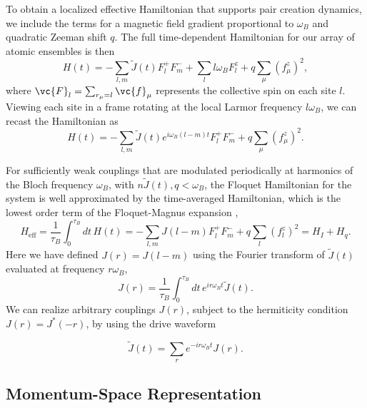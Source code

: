 \begin{bibunit}
To obtain a localized effective Hamiltonian that supports pair creation dynamics, we include the terms for a magnetic field gradient proportional to $\omega_B$ and quadratic Zeeman shift $q$. The full time-dependent Hamiltonian for our array of atomic ensembles is then
\begin{equation}
H(t) = -\sum_{l,m} \tilde{J}(t) F^+_l F^-_m  + \sum_l l \omega_B F^z_l + q\sum_\mu (f^z_\mu)^2,
\label{eq:HtFull}
\end{equation}
where $\vc{F}_l = \sum_{r_{\mu} = l} \vc{f}_\mu$ represents the collective spin on each site $l$. Viewing each site in a frame rotating at the local Larmor frequency $l\omega_B$, we can recast the Hamiltonian as
\begin{equation}
H(t) = -\sum_{l,m}  \tilde{J}(t) e^{i \omega_B (l-m)t}F^+_l F^-_m + q\sum_\mu \left(f^z_\mu\right)^2.
\label{Seq:HtRot}
\end{equation}

For sufficiently weak couplings that are modulated periodically at harmonics of the Bloch frequency $\omega_B$, with $n \tilde{J}(t), q < \omega_B$, the Floquet Hamiltonian for the system is well approximated by the time-averaged Hamiltonian, which is the lowest order term of the Floquet-Magnus expansion \cite{bukov2015universal},
\begin{equation}
H_\text{eff} = \frac{1}{\tau_B} \int_0^{\tau_B} dt\, H(t) = -\sum_{l, m} J(l-m) F^+_l F^-_{m} + q\sum_l (f^z_l)^2 = H_I + H_q.
\label{Seq:H_eff}
\end{equation}
Here we have defined $J(r)= J(l-m)$ using the Fourier transform of $\tilde{J}(t)$ evaluated at frequency $r\omega_B$,
\begin{equation}
J(r) = \frac{1}{\tau_B} \int_0^{\tau_B} dt\, e^{i r \omega_B t} \tilde{J}(t). 
\end{equation}
We can realize arbitrary couplings $J(r)$, subject to the hermiticity condition $J(r) = J^*(-r)$, by using the drive waveform

\begin{equation}
\tilde{J}(t) = \sum_{r} e^{-i r \omega_B t} J(r).
\end{equation}

\subsection{Momentum-Space Representation}


\end{bibunit}

